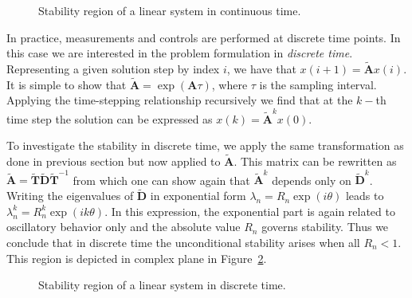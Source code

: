 \begin{figure}[h!]
\centering%
\caption{\label{fig:stability-linear-system-ct}Stability region of a linear system in continuous time.}
\end{figure}

In practice, measurements and controls are performed at discrete time points. In this case we are interested in the problem formulation in \emph{discrete time}. Representing a given solution step by index $i$, we have that $x(i+1)=\tilde{\mathbf{A}}x(i)$. It is simple to show that $\tilde{\mathbf{A}}=\exp(\mathbf{A}\tau)$, where $\tau$ is the sampling interval. Applying the time-stepping relationship recursively we find that at the $k-$th time step the solution can be expressed as $x(k)=\tilde{\mathbf{A}}^{k}x(0)$.

To investigate the stability in discrete time, we apply the same transformation as done in previous section but now applied to $\tilde{\mathbf{A}}$. This matrix can be rewritten as $\tilde{\mathbf{A}}=\tilde{\mathbf{T}}\tilde{\mathbf{D}}\tilde{\mathbf{T}}^{-1}$ from which one can show again that $\tilde{\mathbf{A}}^{k}$ depends only on $\tilde{\mathbf{D}}^{k}$. Writing the eigenvalues of $\tilde{\mathbf{D}}$ in exponential form $\lambda_{n}=R_{n}\exp(i\theta)$ leads to $\lambda_{n}^{k}=R_{n}^{k}\exp(ik\theta)$. In this expression, the exponential part is again related to oscillatory behavior only and the absolute value $R_{n}$ governs stability. Thus we conclude that in discrete time the unconditional stability arises when all $R_{n}<1$. This region is depicted in complex plane in Figure~\ref{fig:stability-linear-system-dt}.

\begin{figure}[h!]
\centering%
\caption{\label{fig:stability-linear-system-dt}Stability region of a linear system in discrete time.}
\end{figure}

\endinput